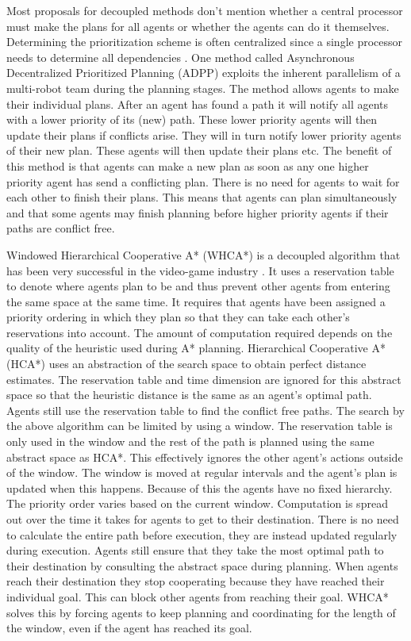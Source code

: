 Most proposals for decoupled methods don't mention whether a central processor
must make the plans for all agents or whether the agents can do it themselves.
Determining the prioritization scheme is often centralized since a
single processor needs to determine all dependencies \cite{bennewitz2002}. One
method called Asynchronous Decentralized Prioritized Planning (ADPP)
\cite{cap2012} exploits the inherent parallelism of a multi-robot team during
the planning stages. The method allows
agents to make their individual plans. After an agent has found a path it will
notify all agents with a lower priority of its (new) path. These lower priority
agents will then update their plans if conflicts arise. They will in turn
notify lower priority agents of their new plan. These agents will then update
their plans etc. The benefit of
this method is that agents can make a new plan as soon as any one higher
priority agent has send a conflicting plan. There is no need for agents to
wait for each other to finish their plans. This means that agents can plan
simultaneously and that some agents may finish planning before higher priority
agents if their paths are conflict free.

Windowed Hierarchical Cooperative A* (WHCA*) is a decoupled algorithm that has
been very successful in the video-game industry \cite{silver2005,botea2013}. It
uses a
reservation table to denote where agents plan to be and thus prevent other
agents from entering the same space at the same time. It requires that agents
have been assigned a priority ordering in which they plan so that they can take
each other's reservations into account. The amount of computation required
depends on the quality of the heuristic used during A* planning. Hierarchical
Cooperative A* (HCA*) uses an abstraction of the search space to obtain perfect
distance estimates. The reservation table and time dimension are ignored for
this abstract space so that the heuristic distance is the same as an agent's
optimal path. Agents still use the reservation table to find the conflict free
paths. The search by the above algorithm can be limited by using a window. The
reservation table is only used in the window and the rest of the path is
planned using the same abstract space as HCA*. This effectively ignores the
other agent's actions outside of the window. The window is moved at regular
intervals and the agent's plan is updated when this happens. Because of this
the agents have no fixed hierarchy. The priority order varies based on the
current window. Computation is spread out over the time it takes for agents to
get to their destination. There is no need to calculate the entire path before
execution, they are instead updated regularly during execution. Agents still
ensure that they take the most optimal path to their destination by consulting
the abstract space during planning. When agents reach their destination they
stop cooperating because they have reached their individual goal. This can
block other agents from reaching their goal. WHCA* solves this by forcing
agents to keep planning and coordinating for the length of the window, even if
the agent has reached its goal.

